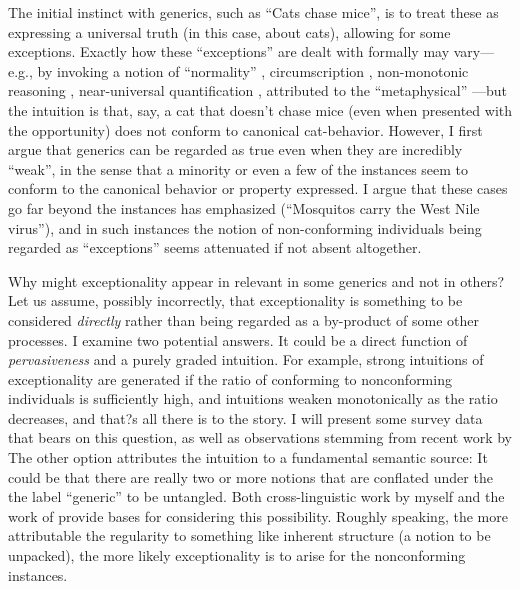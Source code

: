 \documentclass[10pt,letterpaper]{article}
\begin{document}
The initial instinct with generics, such as ``Cats chase mice'', is to treat these as expressing a universal truth (in this case, about cats), allowing for some exceptions.  Exactly how these ``exceptions'' are dealt with formally may vary---e.g., by invoking a notion of ``normality'' \cite{eckardt1999normal}, circumscription \cite{mccarthy1980circumscription}, non-monotonic reasoning \cite{asher1995some}, near-universal quantification \cite{krifka1995introduction}, attributed to the ``metaphysical''  \cite{liebesman2011simple}---but the intuition is that, say, a cat that doesn't chase mice (even when presented with the opportunity) does not conform to canonical cat-behavior.  
However, I first argue that generics can be regarded as true even when they are incredibly ``weak'', in the sense that a minority or even a few of the instances seem to conform to the canonical behavior or property expressed.  
I argue that these cases go far beyond the instances  has emphasized (``Mosquitos carry the West Nile virus''), and in such instances the notion of non-conforming individuals being regarded as ``exceptions'' seems attenuated if not absent altogether.

Why might exceptionality appear in relevant in some generics and not in others? 
Let us assume, possibly incorrectly, that exceptionality is something to be considered \emph{directly} rather than being regarded as a by-product of some other processes.  
I examine two potential answers. 
It could be a direct function of \emph{pervasiveness} and a purely graded intuition.
For example, strong intuitions of exceptionality are generated if the ratio of conforming to nonconforming individuals is sufficiently high, and intuitions weaken monotonically as the ratio decreases, and that?s all there is to the story.  
I will present some survey data that bears on this question, as well as observations stemming from recent work by  
The other option attributes the intuition to a fundamental semantic source: It could be that there are really two or more notions that are conflated under the the label ``generic'' to be untangled. 
Both cross-linguistic work by myself and the work of  provide bases for considering this possibility.  
Roughly speaking, the more attributable the regularity to something like inherent structure (a notion to be unpacked), the more likely exceptionality is to arise for the nonconforming instances.



\setlength{\bibleftmargin}{.125in}
\setlength{\bibindent}{-\bibleftmargin}


\end{document}
